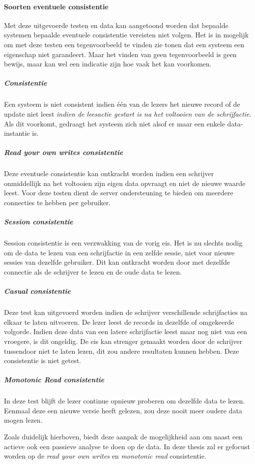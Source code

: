 \paragraph{Soorten eventuele consistentie} Met deze uitgevoerde testen en data kan aangetoond worden dat bepaalde systemen bepaalde eventuele consistentie vereisten niet volgen. Het is in mogelijk om met deze testen een tegenvoorbeeld te vinden zie tonen dat een systeem een eigenschap niet garandeert. Maar het vinden van geen tegenvoorbeeld is geen bewijs, maar kan wel een indicatie zijn hoe vaak het kan voorkomen. 

\subparagraph{Consistentie} Een systeem is niet consistent indien één van de lezers het nieuwe record of de update niet leest \textit{indien de leesactie gestart is na het voltooien van de schrijfactie}. Als dit voorkomt, gedraagt het systeem zich niet alsof er maar een enkele data-instantie is. 

\subparagraph{Read your own writes consistentie} Deze eventuele consistentie kan ontkracht worden indien een schrijver onmiddellijk na het voltooien zijn eigen data opvraagt en niet de nieuwe waarde leest. Voor deze testen dient de server ondersteuning te bieden om meerdere connecties te hebben per gebruiker. 

\subparagraph{Session consistentie} Session consistentie is een verzwakking van de vorig eis. Het is nu slechts nodig om de data te lezen van een schrijfactie in een zelfde sessie, niet voor nieuwe sessies van dezelfde gebruiker. Dit kan ontkracht worden door met dezelfde connectie als de schrijver te lezen en de oude data te lezen. 

\subparagraph{Casual consistentie} Deze test kan uitgevoerd worden indien de schrijver verschillende schrijfacties na elkaar te laten uitvoeren. De lezer leest de records in dezelfde of omgekeerde volgorde. Indien deze data van een latere schrijfactie leest maar nog niet van een vroegere, is dit ongeldig. De eis kan strenger gemaakt worden door de schrijver tussendoor niet te laten lezen, dit zou andere resultaten kunnen hebben. Deze consistentie is niet getest. 

\subparagraph{Monotonic Read consistentie} In deze test blijft de lezer continue opnieuw proberen om dezelfde data te lezen. Eenmaal deze een nieuwe versie heeft gelezen, zou deze nooit meer oudere data mogen lezen. 

Zoals duidelijk hierboven, biedt deze aanpak de mogelijkheid aan om naast een actieve ook een passieve analyse te doen op de data. In deze thesis zal er gefocust worden op de \textit{read your own writes} en \textit{monotonic read} consistentie. 

